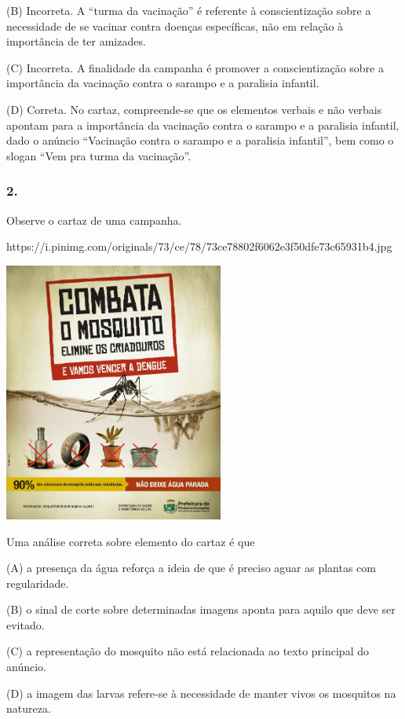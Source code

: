 (B) Incorreta. A ``turma da vacinação'' é referente à conscientização
sobre a necessidade de se vacinar contra doenças específicas, não em
relação à importância de ter amizades.

(C) Incorreta. A finalidade da campanha é promover a conscientização sobre a
importância da vacinação contra o sarampo e a paralisia infantil.

(D) Correta. No cartaz, compreende-se que os elementos verbais e não
verbais apontam para a importância da vacinação contra o sarampo e a
paralisia infantil, dado o anúncio ``Vacinação contra o sarampo e a
paralisia infantil'', bem como o slogan ``Vem pra turma da vacinação''.

\subsubsection{2. }\label{section-45}

Observe o cartaz de uma campanha.

https://i.pinimg.com/originals/73/ce/78/73ce78802f6062e3f50dfe73c65931b4.jpg

\includegraphics[width=2.84375in,height=3.36642in]{media/image13.jpeg}

Uma análise correta sobre elemento do cartaz é que

(A) a presença da água reforça a ideia de que é preciso aguar as plantas com regularidade.

(B) o sinal de corte sobre determinadas imagens aponta para aquilo que deve ser evitado.

(C) a representação do mosquito não está relacionada ao texto principal do anúncio.

(D) a imagem das larvas refere-se à necessidade de manter vivos os mosquitos na natureza.

